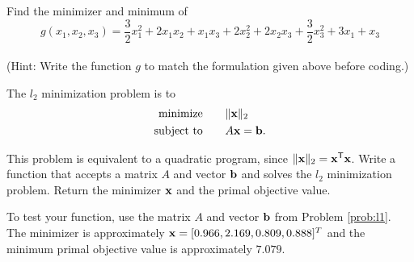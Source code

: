 \begin{problem}
Find the minimizer and minimum of
\begin{equation*}
g(x_1,x_2,x_3) = \frac{3}{2}x_1^2 +2x_1x_2 + x_1x_3+ 2x_2^2 +2x_2x_3+\frac{3}{2}x_3^2+3x_1 + x_3
\end{equation*}
\\(Hint: Write the function $g$ to match the formulation given above before coding.)
\begin{comment}
\begin{equation}
f(x) = \frac{1}{2}x\trp Qx - x\trp p
\end{equation}
where

\begin{center}
$Q =
\begin{bmatrix}
3 & 2 & 1\\
2 & 4 & 2\\
1 & 2 & 3\\
\end{bmatrix}
$
and $p =
\begin{bmatrix}
3\\
0\\
1\\
\end{bmatrix}
$
\end{center}
\end{comment}

\end{problem}


\begin{problem}
The $l_2$ minimization problem is to
\begin{align*}
\text{minimize}\qquad &\|\mathbf{x}\|_2\\
\text{subject to} \qquad &A\mathbf{x} = \mathbf{b}.
\end{align*}

This problem is equivalent to a quadratic program, since $\|\mathbf{x}\|_2 = \mathbf{x}^{\mathsf T} \mathbf{x}$.
Write a function that accepts a matrix $A$ and vector $\mathbf{b}$ and solves the $l_2$ minimization problem.
Return the minimizer $\mathbf{x}$ and the primal objective value.

To test your function, use the matrix $A$ and vector $\mathbf{b}$ from Problem \ref{prob:l1}. 
The minimizer is approximately $\mathbf{x}=[0.966, 2.169, 0.809, 0.888]^T$ and the minimum primal objective value is approximately $7.079$.
\end{problem}

